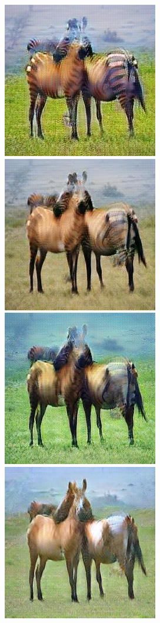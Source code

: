 \documentclass[12pt, fleqn, titlepage]{article}
\newcommand\skipper{1.4pt}
\begin{document}
\begin{figure}[H]
\begin{subfigure}[b]{0.8\textwidth}
		\hskip\skipper
		\includegraphics[width=0.15\linewidth]{imgs/horse2zebra_cycle/gaussnoise/progress/51_20_fake_a}
		\hskip\skipper
		\includegraphics[width=0.15\linewidth]{imgs/horse2zebra_cycle/gaussnoise/progress/51_40_fake_a}
		\hskip\skipper
		\includegraphics[width=0.15\linewidth]{imgs/horse2zebra_cycle/gaussnoise/progress/51_60_fake_a}
		\hskip\skipper
		\includegraphics[width=0.15\linewidth]{imgs/horse2zebra_cycle/gaussnoise/progress/51_140_fake_a}
	\end{subfigure}
\end{figure}
\end{document}
